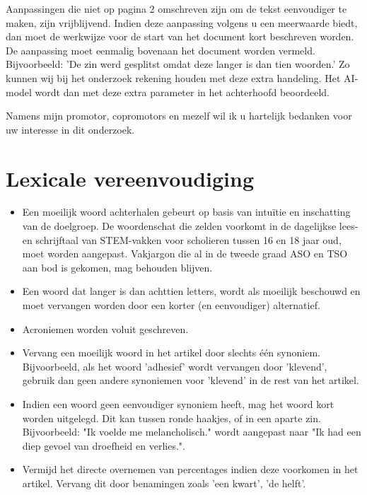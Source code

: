 \documentclass{report}
\begin{document}
	\medspace
	
	Aanpassingen die niet op pagina 2 omschreven zijn om de tekst eenvoudiger te maken, zijn vrijblijvend. Indien deze aanpassing volgens u een meerwaarde biedt, dan moet de werkwijze voor de start van het document kort beschreven worden. De aanpassing moet eenmalig bovenaan het document worden vermeld. Bijvoorbeeld: 'De zin werd gesplitst omdat deze langer is dan tien woorden.' Zo kunnen wij bij het onderzoek rekening houden met deze extra handeling. Het AI-model wordt dan met deze extra parameter in het achterhoofd beoordeeld.
	
	\medspace
	
	Namens mijn promotor, copromotors en mezelf wil ik u hartelijk bedanken voor uw interesse in dit onderzoek.
	
	\newpage
	
	\section{Lexicale vereenvoudiging}
	
	\begin{itemize}
		\item Een moeilijk woord achterhalen gebeurt op basis van intuïtie en inschatting van de doelgroep. De woordenschat die zelden voorkomt in de dagelijkse lees- en schrijftaal van STEM-vakken voor scholieren tussen 16 en 18 jaar oud, moet worden aangepast. Vakjargon die al in de tweede graad ASO en TSO aan bod is gekomen, mag behouden blijven.
		\item Een woord dat langer is dan achttien letters, wordt als moeilijk beschouwd en moet vervangen worden door een korter (en eenvoudiger) alternatief.
		\item Acroniemen worden voluit geschreven.
		\item Vervang een moeilijk woord in het artikel door slechts één synoniem. Bijvoorbeeld, als het woord 'adhesief' wordt vervangen door 'klevend', gebruik dan geen andere synoniemen voor 'klevend' in de rest van het artikel. 
		\item Indien een woord geen eenvoudiger synoniem heeft, mag het woord kort worden uitgelegd. Dit kan tussen ronde haakjes, of in een aparte zin. Bijvoorbeeld: "Ik voelde me melancholisch." wordt aangepast naar "Ik had een diep gevoel van droefheid en verlies.".		
		\item Vermijd het directe overnemen van percentages indien deze voorkomen in het artikel. Vervang dit door benamingen zoals 'een kwart', 'de helft'. 
	\end{itemize}
	
\end{document}
